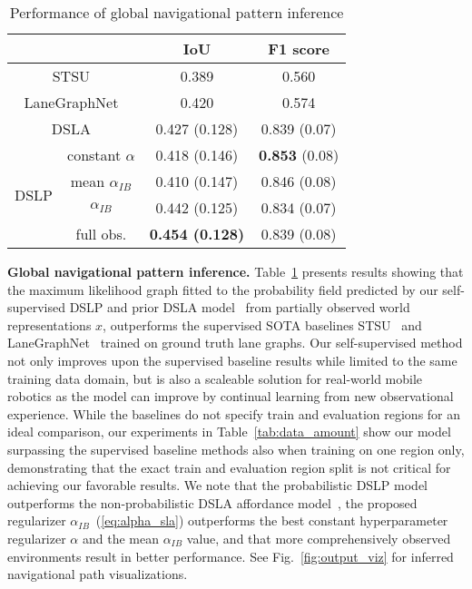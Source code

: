 \documentclass[letterpaper, 10 pt, conference]{ieeeconf}
\begin{document}
\begin{table}[t]\caption{Performance of global navigational pattern inference}
\vspace{-4mm}
\begin{center}
\begin{tabular}{|cc|c|c|}
    \hline
      \multicolumn{2}{|c|}{} & IoU & F1 score \\
    \hline
    \multicolumn{2}{|c|}{STSU~\cite{can2021stsu}} & 0.389 & 0.560 \\
    \hline
    \multicolumn{2}{|c|}{LaneGraphNet~\cite{zurn2021lanegraphnet}} & 0.420 & 0.574 \\
    \hline
    \multicolumn{2}{|c|}{DSLA~\cite{karlsson2020dsla}} & 0.427 (0.128) & 0.839 (0.07) \\
    \hline
     \multirow{4}{*}{DSLP} & constant $\alpha$ & 0.418 (0.146) & \textbf{0.853} (0.08) \\
    \cline{2-4}
    & mean $\alpha_{IB}$ & 0.410 (0.147) & 0.846 (0.08) \\
    \cline{2-4}
    & $\alpha_{IB}$ & 0.442 (0.125) & 0.834 (0.07) \\
    \cline{2-4}
    & full obs. & \textbf{0.454 (0.128)} & 0.839 (0.08) \\
    \hline
\end{tabular}
\label{tab:graph_performance}
\end{center}
\vspace{-7.5mm}
\end{table}

\textbf{Global navigational pattern inference.} Table~\ref{tab:graph_performance}
presents results showing that the maximum likelihood graph fitted to the probability field predicted by our self-supervised DSLP and prior DSLA model~\cite{karlsson2020dsla} from partially observed world representations $x$, outperforms the supervised SOTA baselines STSU~\cite{can2021stsu} and LaneGraphNet~\cite{zurn2021lanegraphnet} trained on ground truth lane graphs. Our self-supervised method not only improves upon the supervised baseline results while limited to the same training data domain, but is also a scaleable solution for real-world mobile robotics as the model can improve by continual learning from new observational experience. While the baselines do not specify train and evaluation regions for an ideal comparison, our experiments in Table~\ref{tab:data_amount} show our model surpassing the supervised baseline methods also when training on one region only, demonstrating that the exact train and evaluation region split is not critical for achieving our favorable results.
We note that the probabilistic DSLP model outperforms the non-probabilistic DSLA affordance model~\cite{karlsson2020dsla}, 
the proposed regularizer $\alpha_{IB}$~(\ref{eq:alpha_sla}) outperforms the best constant hyperparameter regularizer $\alpha$ and the mean $\alpha_{IB}$ value,
and that more comprehensively observed environments result in better performance. See Fig.~\ref{fig:output_viz} for inferred navigational path visualizations.
\end{document}
